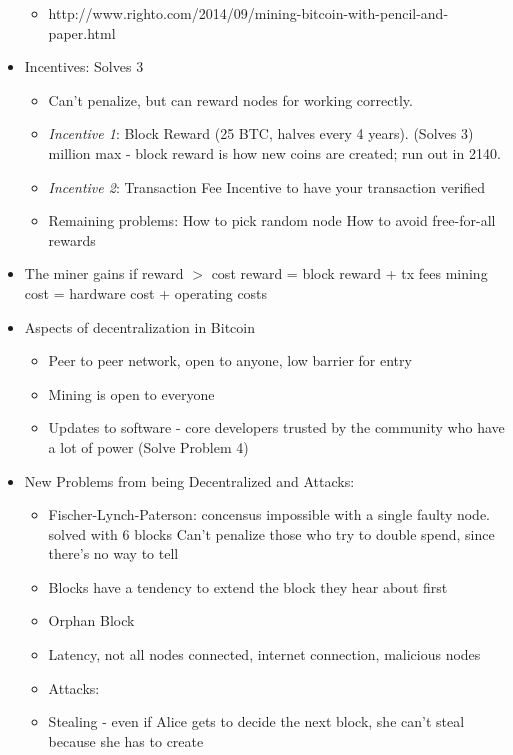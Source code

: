 \documentclass{article}
\begin{document}
\begin{itemize}
\begin{itemize}
      \item http://www.righto.com/2014/09/mining-bitcoin-with-pencil-and-paper.html
    \end{itemize}
  \item Incentives: Solves 3
    \begin{itemize}
      \item Can't penalize, but can reward nodes for working correctly.
      \item \emph{Incentive 1}: Block Reward (25 BTC, halves every 4 years). (Solves 3)
         million max - block reward is how new coins are created; run out in 2140.
      \item \emph{Incentive 2}: Transaction Fee
        \subitem Incentive to have your transaction verified
      \item Remaining problems: 
        \subitem How to pick random node
        \subitem How to avoid free-for-all rewards
    \end{itemize}
  \item The miner gains if reward $>$ cost
    \subitem reward = block reward + tx fees
    \subitem mining cost = hardware cost + operating costs
  \item Aspects of decentralization in Bitcoin
    \begin{itemize}
      \item Peer to peer network, open to anyone, low barrier for entry
      \item Mining is open to everyone
      \item Updates to software - core developers trusted by the community who have a lot of power (Solve Problem 4)
    \end{itemize}
  \item New Problems from being Decentralized and Attacks:
    \begin{itemize}
      \item Fischer-Lynch-Paterson: concensus impossible with a single faulty node.\\
        solved with 6 blocks 
        \subitem Can't penalize those who try to double spend, since there's no way to tell
      \item Blocks have a tendency to extend the block they hear about first
      \item Orphan Block
      \item Latency, not all nodes connected, internet connection, malicious nodes
      \item Attacks:
      \item Stealing - even if Alice gets to decide the next block, she can't steal because she has to create

\end{itemize}
\end{itemize}
\end{document}
